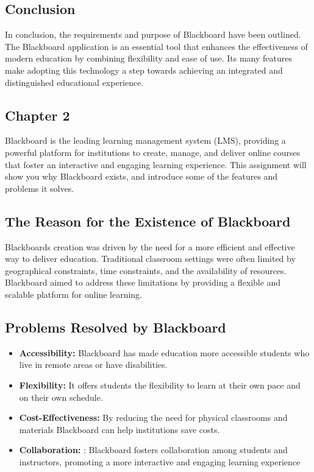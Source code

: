 \documentclass[a4paper,12pt]{article}
\begin{document}
\subsection{Conclusion}
In conclusion, the requirements and purpose of Blackboard have been outlined.
The Blackboard application is an essential tool that enhances the effectiveness of modern education by combining flexibility and ease of use. Its many features make adopting this technology a step towards achieving an integrated and distinguished educational experience.


\newpage 

\begin{center}
\vspace*{10cm} 
\section{Chapter 2}
\end{center}

\newpage


Blackboard is the leading learning management system (LMS), providing a
powerful platform for institutions to create, manage, and deliver online courses that foster an interactive and engaging learning experience. This assignment will show you why Blackboard exists, and introduce some of the features and problems it solves.

\subsection{The Reason for the Existence of Blackboard}
Blackboards creation was driven by the need for a more efficient and
effective way to deliver education. Traditional classroom settings were often
limited by geographical constraints, time constraints, and the availability of
resources. Blackboard aimed to address these limitations by providing a flexible and scalable platform for online learning.

\subsection{Problems Resolved by Blackboard}
\begin{itemize}
    \item \textbf{Accessibility:} Blackboard has made education more
 accessible students who live in remote areas or have disabilities.
    \item \textbf{Flexibility:}  It offers students the flexibility to learn at their own pace and on their own schedule.
    \item \textbf{Cost-Effectiveness:}  By reducing the need for physical classrooms and materials Blackboard can help institutions save costs.
    \item \textbf{Collaboration:} : Blackboard fosters collaboration among students and instructors, promoting a more interactive and engaging learning experience
\end{itemize}
\end{document}
